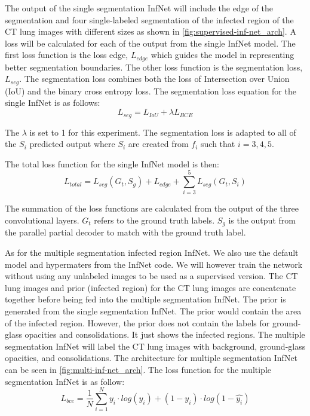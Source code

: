 The output of the single segmentation InfNet will include the edge of the segmentation and four single-labeled segmentation of the infected region of the CT lung images with different sizes as shown in \ref{fig:supervised-inf-net_arch}. A loss will be calculated for each of the output from the single InfNet model. The first loss function is the loss edge, $L_{edge}$ which guides the model in representing better segmentation boundaries. The other loss function is the segmentation loss, ${L_{seg}}$. The segmentation loss combines both the loss of Intersection over Union (IoU) and the binary cross entropy loss. The segmentation loss equation for the single InfNet is as follows:
\begin{equation}
L_{seg} = L_{IoU} + \lambda L_{BCE}
\end{equation}

The $\lambda$ is set to 1 for this experiment. The segmentation loss is adapted to all of the ${S_i}$ predicted output where ${S_i}$ are created from $f_i$ such that $i={3,4,5}$. 

The total loss function for the single InfNet model is then:
\begin{equation}
L_{total} = L_{seg}(G_t, S_g) + L_{edge} + 	\sum_{i=3}^{5}L_{seg}(G_t, S_i)
\end{equation}

The summation of the loss functions are calculated from the output of the three convolutional layers. $G_t$ refers to the ground truth labels. $S_g$ is the output from the parallel partial decoder to match with the ground truth label.

As for the multiple segmentation infected region InfNet. We also use the default model and hypermaters from the InfNet code. We will however train the network without using any unlabeled images to be used as a supervised version. The CT lung images and prior (infected region) for the CT lung images are concatenate together before being fed into the multiple segmentation InfNet. The prior is generated from the single segmentation InfNet. The prior would contain the area of the infected region. However, the prior does not contain the labels for ground-glass opacities and consolidations. It just shows the infected regions. The multiple segmentation InfNet will label the CT lung images with background, ground-glass opacities, and consolidations. The architecture for multiple segmentation InfNet can be seen in \ref{fig:multi-inf-net_arch}. The loss function for the multiple segmentation InfNet is as follow:
\begin{equation}
L_{bce} = \frac{1}{N}\sum_{i=1}^{N} y_i \cdot log(\hat{y_i}) + (1-y_i)\cdot log(1-\hat{y_i})
\end{equation}


